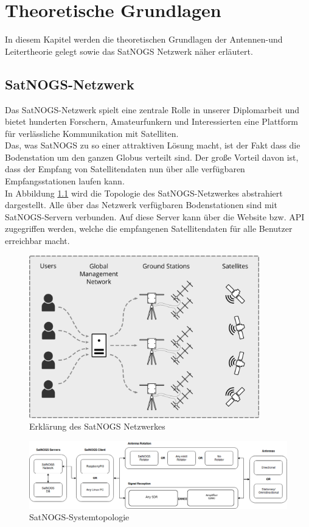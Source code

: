 \chapter{Theoretische Grundlagen}
In diesem Kapitel werden die theoretischen Grundlagen der Antennen-und Leitertheorie gelegt sowie das SatNOGS Netzwerk näher erläutert.

\section{SatNOGS-Netzwerk}
Das SatNOGS-Netzwerk spielt eine zentrale Rolle in unserer Diplomarbeit und bietet hunderten Forschern, Amateurfunkern und Interessierten eine Plattform für verlässliche Kommunikation mit Satelliten.\\

Das, was SatNOGS zu so einer attraktiven Lösung macht, ist der Fakt dass die Bodenstation um den ganzen Globus verteilt sind. Der große Vorteil davon ist, dass der Empfang von Satellitendaten nun über alle verfügbaren Empfangsstationen laufen kann.\\

In Abbildung \ref{fig:SatNOGS_Erklärung} wird die Topologie des SatNOGS-Netzwerkes abstrahiert dargestellt.
Alle über das Netzwerk verfügbaren Bodenstationen sind mit SatNOGS-Servern verbunden. Auf diese Server kann über die Website bzw. API zugegriffen werden, welche die empfangenen Satellitendaten für alle Benutzer erreichbar macht.

\begin{figure}[h]
	\centering
	\includegraphics[width=10cm]{../ref/SatNOGS_explanation}
	\caption{Erklärung des SatNOGS Netzwerkes}
	\label{fig:SatNOGS_Erklärung}
\end{figure}	

\begin{figure}[h]
	\centering
	\includegraphics[width=16cm]{../ref/SatNOGS_BlockDiagram}
	\caption{SatNOGS-Systemtopologie}
	\label{fig:SatNOGS_Systemtopologie}
\end{figure}

